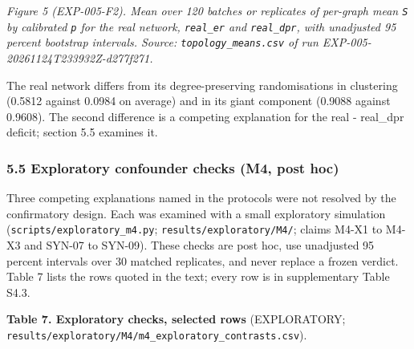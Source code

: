 \documentclass[
]{article}
\begin{document}
\emph{Figure 5 (EXP-005-F2). Mean over 120 batches or replicates of
per-graph mean \texttt{S} by calibrated \texttt{p} for the real network,
\texttt{real\_er} and \texttt{real\_dpr}, with unadjusted 95 percent
bootstrap intervals. Source: \texttt{topology\_means.csv} of run
EXP-005-20261124T233932Z-d277f271.}

The real network differs from its degree-preserving randomisations in
clustering (0.5812 against 0.0984 on average) and in its giant component
(0.9088 against 0.9608). The second difference is a competing
explanation for the real - real\_dpr deficit; section 5.5 examines it.

\subsubsection{5.5 Exploratory confounder checks (M4, post
hoc)}\label{exploratory-confounder-checks-m4-post-hoc}

Three competing explanations named in the protocols were not resolved by
the confirmatory design. Each was examined with a small exploratory
simulation (\texttt{scripts/exploratory\_m4.py};
\texttt{results/exploratory/M4/}; claims M4-X1 to M4-X3 and SYN-07 to
SYN-09). These checks are post hoc, use unadjusted 95 percent intervals
over 30 matched replicates, and never replace a frozen verdict. Table 7
lists the rows quoted in the text; every row is in supplementary Table
S4.3.

\textbf{Table 7. Exploratory checks, selected rows} (EXPLORATORY;
\texttt{results/exploratory/M4/m4\_exploratory\_contrasts.csv}).
\end{document}
